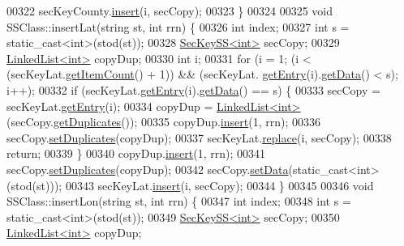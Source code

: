 \begin{DoxyCode}
00322     secKeyCounty.\hyperlink{classLinkedList_ae8a19375505e87e2e4fc0e9b5afe4d4d}{insert}(i, secCopy);
00323 \}
00324 
00325 \textcolor{keywordtype}{void} SSClass::insertLat(\textcolor{keywordtype}{string} st, \textcolor{keywordtype}{int} rrn) \{
00326     \textcolor{keywordtype}{int} index;
00327     \textcolor{keywordtype}{int} s = \textcolor{keyword}{static\_cast<}\textcolor{keywordtype}{int}\textcolor{keyword}{>}(stod(st));
00328     \hyperlink{classSecKeySS}{SecKeySS<int>} secCopy;
00329     \hyperlink{classLinkedList}{LinkedList<int>} copyDup;
00330         \textcolor{keywordtype}{int} i;
00331     \textcolor{keywordflow}{for} (i = 1; (i < (secKeyLat.\hyperlink{classLinkedList_afc6635f854f48f2f126cf3b60d845220}{getItemCount}() + 1)) && (secKeyLat.
      \hyperlink{classLinkedList_a341bfd7772c9d24d29eb7a7f3936915b}{getEntry}(i).\hyperlink{classSecKeySS_a9fdb8a771250b7aaab556f019b381eab}{getData}() < s); i++);
00332     \textcolor{keywordflow}{if} (secKeyLat.\hyperlink{classLinkedList_a341bfd7772c9d24d29eb7a7f3936915b}{getEntry}(i).\hyperlink{classSecKeySS_a9fdb8a771250b7aaab556f019b381eab}{getData}() == s) \{
00333         secCopy = secKeyLat.\hyperlink{classLinkedList_a341bfd7772c9d24d29eb7a7f3936915b}{getEntry}(i);
00334         copyDup = \hyperlink{classLinkedList}{LinkedList<int>}(secCopy.\hyperlink{classSecKeySS_abef7c9c03e9bc6b818d599966428fdec}{getDuplicates}());
00335         copyDup.\hyperlink{classLinkedList_ae8a19375505e87e2e4fc0e9b5afe4d4d}{insert}(1, rrn);
00336         secCopy.\hyperlink{classSecKeySS_a95fdde8fc0b590359692784d15481dd4}{setDuplicates}(copyDup);
00337         secKeyLat.\hyperlink{classLinkedList_a3035f880c50e7d8f68e67c093d4607ca}{replace}(i, secCopy);
00338         \textcolor{keywordflow}{return};
00339     \}
00340     copyDup.\hyperlink{classLinkedList_ae8a19375505e87e2e4fc0e9b5afe4d4d}{insert}(1, rrn);
00341     secCopy.\hyperlink{classSecKeySS_a95fdde8fc0b590359692784d15481dd4}{setDuplicates}(copyDup);
00342     secCopy.\hyperlink{classSecKeySS_ae893fbaf619bf61f73f1585ae5686609}{setData}(static\_cast<int>(stod(st)));
00343     secKeyLat.\hyperlink{classLinkedList_ae8a19375505e87e2e4fc0e9b5afe4d4d}{insert}(i, secCopy);
00344 \}
00345 
00346 \textcolor{keywordtype}{void} SSClass::insertLon(\textcolor{keywordtype}{string} st, \textcolor{keywordtype}{int} rrn) \{
00347     \textcolor{keywordtype}{int} index;
00348     \textcolor{keywordtype}{int} s = \textcolor{keyword}{static\_cast<}\textcolor{keywordtype}{int}\textcolor{keyword}{>}(stod(st));
00349     \hyperlink{classSecKeySS}{SecKeySS<int>} secCopy;
00350     \hyperlink{classLinkedList}{LinkedList<int>} copyDup;

\end{DoxyCode}
